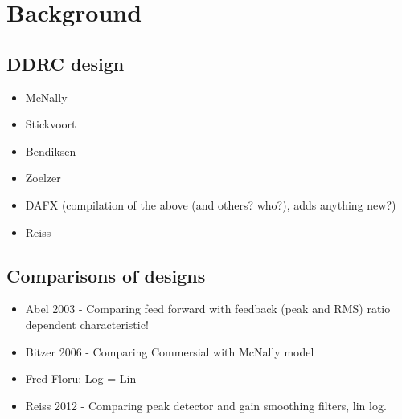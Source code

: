 \documentclass[../main2.tex]{subfiles}
\begin{document}
\section{Background}

\subsection{DDRC design}
\begin{itemize}
\item McNally
\item Stickvoort
\item Bendiksen
\item Zoelzer
\item DAFX (compilation of the above (and others? who?), adds anything new?)
\item Reiss


\end{itemize}

\subsection{Comparisons of designs}
\begin{itemize}
\item Abel 2003 - Comparing feed forward with feedback (peak and RMS) ratio dependent characteristic!
\item Bitzer 2006 - Comparing Commersial with McNally model
\item Fred Floru: Log = Lin
\item Reiss 2012 - Comparing peak detector and gain smoothing filters, lin log. 
\end{itemize}
\end{document}
